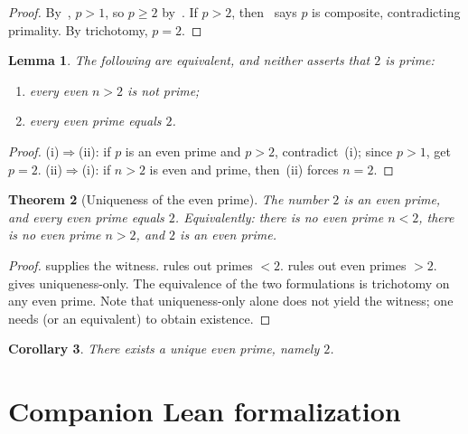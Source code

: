 \documentclass[11pt,reqno]{amsart}
\theoremstyle{plain}
\newtheorem{theorem}{Theorem}[section]
\newtheorem{lemma}[theorem]{Lemma}
\newtheorem{corollary}[theorem]{Corollary}
\theoremstyle{definition}
\theoremstyle{remark}
\numberwithin{equation}{section}
\begin{document}
\begin{proof}
By~, \(p>1\), so \(p\ge 2\) by~. If
\(p>2\), then~ says \(p\) is composite, contradicting
primality. By trichotomy, \(p=2\).
\end{proof}

\begin{lemma}
\label{lem:above-iff-unique}
The following are equivalent, and neither asserts that \(2\) is prime:
\begin{enumerate}[label=(\roman*)]
  \item every even \(n>2\) is not prime;
  \item every even prime equals \(2\).
\end{enumerate}
\end{lemma}

\begin{proof}
(i)\(\Rightarrow\)(ii): if \(p\) is an even prime and \(p>2\),
contradict~(i); since \(p>1\), get \(p=2\).
(ii)\(\Rightarrow\)(i): if \(n>2\) is even and prime,
then~(ii) forces \(n=2\).
\end{proof}

\begin{theorem}[Uniqueness of the even prime]
\label{thm:grand}
The number \(2\) is an even prime, and every even prime equals \(2\).
Equivalently: there is no even prime \(n<2\), there is no even prime
\(n>2\), and \(2\) is an even prime.
\end{theorem}

\begin{proof}
 supplies the witness.  rules out
primes \(<2\).  rules out even primes \(>2\).
 gives uniqueness-only. The equivalence of the
two formulations is trichotomy on any even prime. Note that
uniqueness-only alone does not yield the witness; one needs
 (or an equivalent) to obtain existence.
\end{proof}

\begin{corollary}
\label{cor:unique}
There exists a unique even prime, namely \(2\).
\end{corollary}

\section{Companion Lean formalization}
\label{sec:lean}
\end{document}
